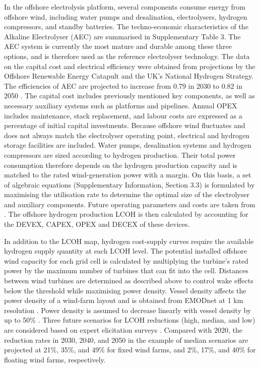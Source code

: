 \documentclass[pdflatex,lineno,sn-mathphys,Numbered]{sn-jnl}%
\begin{document}
In the offshore electrolysis platform, several components consume energy from offshore wind, including water pumps and desalination, electrolysers, hydrogen compressors, and standby batteries.
The techno-economic characteristics of the Alkaline Electrolyser (AEC) are summarised in Supplementary Table 3. The AEC system is currently the most mature and durable among these three options, and is therefore used as the reference electrolyser technology. The data on the capital cost and electrical efficiency were obtained from projections by the Offshore Renewable Energy Catapult and the UK's National Hydrogen Strategy. The efficiencies of AEC are projected to increase from 0.79 in 2030 to 0.82 in 2050 \cite{HydrogenAnalyticalAnnex}.
The capital cost includes previously mentioned key components, as well as necessary auxiliary systems such as platforms and pipelines. Annual OPEX includes maintenance, stack replacement, and labour costs are expressed as a percentage of initial capital investments.
Because offshore wind fluctuates and does not always match the electrolyser operating point, electrical and hydrogen storage facilities are included. Water pumps, desalination systems and hydrogen compressors are sized according to hydrogen production. Their total power consumption therefore depends on the hydrogen production capacity and is matched to the rated wind-generation power with a margin. On this basis, a set of algebraic equations (Supplementary Information, Section 3.3) is formulated by maximising the utilisation rate to determine the optimal size of the electrolyser and auxiliary components. Future operating parameters and costs are taken from \cite{OffshoreWindandHydrogen}. The offshore hydrogen production LCOH is then calculated by accounting for the DEVEX, CAPEX, OPEX and DECEX of these devices.

In addition to the LCOH map, hydrogen cost-supply curves require the available hydrogen supply quantity at each LCOH level. The potential installed
offshore wind capacity for each grid cell is calculated by multiplying the turbine's rated power by the maximum number of turbines that can fit into the cell. Distances between wind turbines are determined as described above to control wake effects below the threshold while maximising power density. Vessel density affects the power density of a wind-farm layout and is obtained from EMODnet at 1 km resolution \cite{RouteDensityMap}. Power density is assumed to decrease linearly with vessel density by up to 50\% \cite{guo2023grid}.
Three future scenarios for LCOH reductions (high, median, and low) are considered based on expert elicitation surveys \cite{wiser2021expert}. Compared with 2020, the reduction rates in 2030, 2040, and 2050 in the example of median scenarios are projected at 21\%, 35\%, and 49\% for fixed wind farms, and 2\%, 17\%, and 40\% for floating wind farms, respectively.
\end{document}
